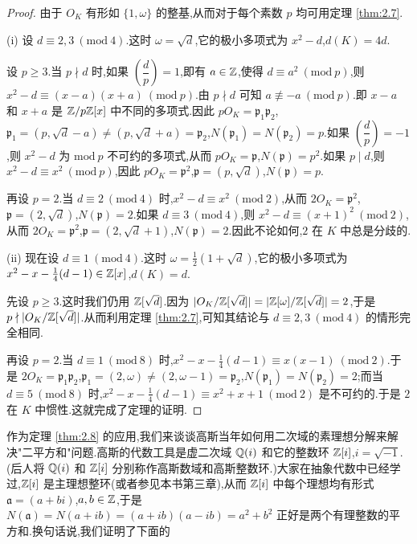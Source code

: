 \begin{proof}
由于 $O_K$ 有形如 $\{1,\omega\}$ 的整基,从而对于每个素数 $p$ 均可用定理 \ref{thm:2.7}.

(i) 设 $d\equiv 2,3\ (\mathrm{mod}\ 4)$.这时 $\omega=\sqrt{d}$,它的极小多项式为 $x^2-d$,$d(K)=4d$.

设 $p\geqslant 3$.当 $p\nmid d$ 时,如果 $\left(\dfrac{d}{p}\right)=1$,即有 $a\in\mathbb{Z}$,使得 $d\equiv a^2\ (\mathrm{mod}\ p)$,则 $x^2-d\equiv(x-a)(x+a)\ (\mathrm{mod}\ p)$.由 $p\nmid d$ 可知 $a\not\equiv-a\ (\mathrm{mod}\ p)$.即 $x-a$ 和 $x+a$ 是 $\mathbb{Z}/p\mathbb{Z}[x]$ 中不同的多项式.因此 $pO_K=\mathfrak{p}_1\mathfrak{p}_2$,$\mathfrak{p}_1=(p,\sqrt{d}-a)\neq(p,\sqrt{d}+a)=\mathfrak{p}_2$,$N(\mathfrak{p}_1)=N(\mathfrak{p}_2)=p$.如果 $\left(\dfrac{d}{p}\right)=-1$,则 $x^2-d$ 为 $\mathrm{mod}\ p$ 不可约的多项式,从而 $pO_K=\mathfrak{p}$,$N(\mathfrak{p})=p^2$.如果 $p\mid d$,则 $x^2-d\equiv x^2\ (\mathrm{mod}\ p)$,因此 $pO_K=\mathfrak{p}^2$,$\mathfrak{p}=(p,\sqrt{d})$,$N(\mathfrak{p})=p$.

再设 $p=2$.当 $d\equiv 2\ (\mathrm{mod}\ 4)$ 时,$x^2-d\equiv x^2\ (\mathrm{mod}\ 2)$,从而 $2O_K=\mathfrak{p}^2$,$\mathfrak{p}=(2,\sqrt{d})$,$N(\mathfrak{p})=2$.如果 $d\equiv 3\ (\mathrm{mod}\ 4)$,则 $x^2-d\equiv(x+1)^2\ (\mathrm{mod}\ 2)$,从而 $2O_K=\mathfrak{p}^2$,$\mathfrak{p}=(2,\sqrt{d}+1)$,$N(\mathfrak{p})=2$.因此不论如何,$2$ 在 $K$ 中总是分歧的.

(ii) 现在设 $d\equiv 1\ (\mathrm{mod}\ 4)$.这时 $\omega=\frac{1}{2}(1+\sqrt{d})$,它的极小多项式为 $x^2-x-\frac{1}{4}(d-1)\in\mathbb{Z}[x]$,$d(K)=d$.

先设 $p\geqslant 3$.这时我们仍用 $\mathbb{Z}[\sqrt{d}]$.因为 $|O_K/\mathbb{Z}[\sqrt{d}]|=|\mathbb{Z}[\omega]/\mathbb{Z}[\sqrt{d}]|=2$,于是 $p\nmid|O_K/\mathbb{Z}[\sqrt{d}]|$.从而利用定理 \ref{thm:2.7},可知其结论与 $d\equiv 2,3\ (\mathrm{mod}\ 4)$ 的情形完全相同.

再设 $p=2$.当 $d\equiv 1\ (\mathrm{mod}\ 8)$ 时,$x^2-x-\frac{1}{4}(d-1)\equiv x(x-1)\ (\mathrm{mod}\ 2)$.于是 $2O_K=\mathfrak{p}_1\mathfrak{p}_2$,$\mathfrak{p}_1=(2,\omega)\neq(2,\omega-1)=\mathfrak{p}_2$,$N(\mathfrak{p}_1)=N(\mathfrak{p}_2)=2$;而当 $d\equiv 5\ (\mathrm{mod}\ 8)$ 时,$x^2-x-\frac{1}{4}(d-1)\equiv x^2+x+1\ (\mathrm{mod}\ 2)$ 是不可约的.于是 $2$ 在 $K$ 中惯性.这就完成了定理的证明.
\end{proof}

作为定理 \ref{thm:2.8} 的应用,我们来谈谈高斯当年如何用二次域的素理想分解来解决"二平方和"问题.高斯的代数工具是虚二次域 $\mathbb{Q}(i)$ 和它的整数环 $\mathbb{Z}[i]$,$i=\sqrt{-1}$.(后人将 $\mathbb{Q}(i)$ 和 $\mathbb{Z}[i]$ 分别称作高斯数域和高斯整数环.)大家在抽象代数中已经学过,$\mathbb{Z}[i]$ 是主理想整环(或者参见本书第三章),从而 $\mathbb{Z}[i]$ 中每个理想均有形式 $\mathfrak{a}=(a+bi)$,$a,b\in\mathbb{Z}$,于是 $N(\mathfrak{a})=N(a+ib)=(a+ib)(a-ib)=a^2+b^2$ 正好是两个有理整数的平方和.换句话说,我们证明了下面的

